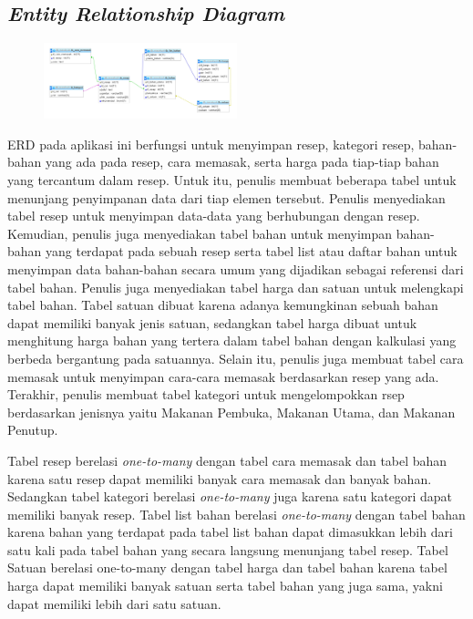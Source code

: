 	\subsection{\emph{Entity Relationship Diagram}}
		\begin{figure}[H]
			\centering
			\includegraphics[angle=90,origin=c,width=0.5\textwidth]{gambar/erd_terbaru}
		\end{figure}
		ERD pada aplikasi ini berfungsi untuk menyimpan resep, kategori resep, bahan-bahan yang ada  pada resep, cara memasak, serta harga pada tiap-tiap bahan yang tercantum dalam resep. Untuk itu, penulis membuat beberapa tabel untuk menunjang penyimpanan data dari tiap elemen tersebut. Penulis menyediakan tabel resep untuk menyimpan data-data yang berhubungan dengan resep. Kemudian, penulis juga menyediakan tabel bahan untuk menyimpan bahan-bahan yang terdapat pada sebuah resep serta tabel list atau daftar bahan untuk menyimpan data bahan-bahan secara umum yang dijadikan sebagai referensi dari tabel bahan. Penulis juga menyediakan tabel harga dan satuan untuk melengkapi tabel bahan. Tabel satuan dibuat karena adanya kemungkinan sebuah bahan dapat memiliki banyak jenis satuan, sedangkan tabel harga dibuat untuk menghitung harga bahan yang tertera dalam tabel bahan dengan kalkulasi yang berbeda bergantung pada satuannya. Selain itu, penulis juga membuat tabel cara memasak untuk menyimpan cara-cara memasak berdasarkan resep yang ada. Terakhir, penulis membuat tabel kategori untuk mengelompokkan rsep berdasarkan jenisnya yaitu Makanan Pembuka, Makanan Utama, dan Makanan Penutup.
		
		Tabel resep berelasi \textit{one-to-many} dengan tabel cara memasak dan tabel bahan karena satu resep dapat memiliki banyak cara memasak dan banyak bahan. Sedangkan tabel kategori berelasi \textit{one-to-many} juga karena satu kategori dapat memiliki banyak resep. Tabel list bahan berelasi \textit{one-to-many} dengan tabel bahan karena bahan yang terdapat pada tabel list bahan dapat dimasukkan lebih dari satu kali pada tabel bahan yang secara langsung menunjang tabel resep. Tabel Satuan berelasi one-to-many dengan tabel harga dan tabel bahan karena tabel harga dapat memiliki banyak satuan serta tabel bahan yang juga sama, yakni dapat memiliki lebih dari satu satuan.   
